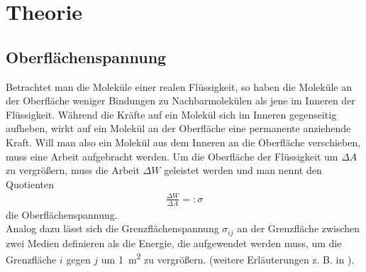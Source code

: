 \section{Theorie}
%
\subsection{Oberflächenspannung}
Betrachtet man die Moleküle einer realen Flüssigkeit, so haben die Moleküle an der Oberfläche weniger Bindungen zu Nachbarmolekülen als jene im Inneren der Flüssigkeit. Während die Kräfte auf ein Molekül sich im Inneren gegenseitig aufheben, wirkt auf ein Molekül an der Oberfläche eine permanente anziehende Kraft. Will man also ein Molekül aus dem Inneren an die Oberfläche verschieben, muss eine Arbeit aufgebracht werden.  Um die Oberfläche der Flüssigkeit um $\Delta A$ zu vergrößern, muss die Arbeit $\Delta W$ geleistet werden und man nennt den Quotienten
%
\begin{align}
	\frac{\Delta W}{\Delta A} =: \sigma
\end{align}
%
die Oberflächenspannung. \cite{Demtroeder:2008:Book}\\
%
Analog dazu lässt sich die Grenzflächenspannung $\sigma_{ij}$ an der Grenzfläche zwischen zwei Medien definieren als die Energie, die aufgewendet werden muss, um die Grenzfläche $i$ gegen $j$ um \SI{1}{\m\squared} zu vergrößern. (weitere Erläuterungen z. B. in \cite{Demtroeder:2008:Book}).
